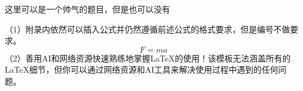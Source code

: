 \documentclass[answer]{cphos}
\begin{document}
\begin{problem}[40]{这里可以是一个帅气的题目，但是也可以没有}
\begin{solution}
\scoring  %

\begin{problemappendix}
\noindent（1）附录内依然可以插入公式并仍然遵循前述公式的格式要求，但是编号不做要求。
\begin{equation*}
    F = ma
\end{equation*}
\noindent（2）善用AI和网络资源快速熟练地掌握\LaTeX 的使用！该模板无法涵盖所有的\LaTeX 细节，但你可以通过网络资源和AI工具来解决使用过程中遇到的任何问题。
\end{problemappendix}

\end{solution}

\end{problem}
\end{document}
